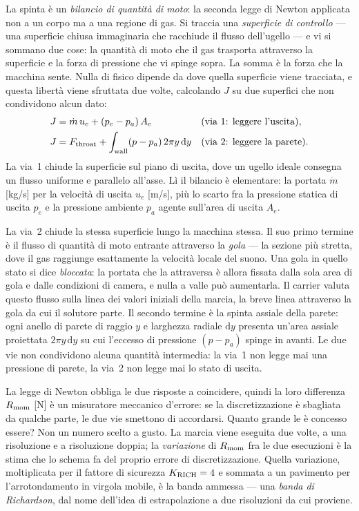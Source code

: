 La spinta è un \emph{bilancio di quantità di moto}: la seconda legge
di Newton applicata non a un corpo ma a una regione di gas. Si
traccia una \emph{superficie di controllo} --- una superficie chiusa
immaginaria che racchiude il flusso dell'ugello --- e vi si sommano
due cose: la quantità di moto che il gas trasporta attraverso la
superficie e la forza di pressione che vi spinge sopra. La somma è
la forza che la macchina sente. Nulla di fisico dipende da dove
quella superficie viene tracciata, e questa libertà viene sfruttata
due volte, calcolando $J$ su due superfici che non condividono alcun
dato:
\begin{align}
J &= \dot m\, u_e + (p_e - p_a)\, A_e
  &&\text{(via 1: leggere l'uscita),} \label{eq:route1}\\
J &= F_{\rm throat} + \int_{\rm wall} (p - p_a)\, 2\pi y \,\mathrm{d}y
  &&\text{(via 2: leggere la parete).} \label{eq:route2}
\end{align}
La via~1 chiude la superficie sul piano di uscita, dove un ugello
ideale consegna un flusso uniforme e parallelo all'asse. Lì il
bilancio è elementare: la portata $\dot m$ [kg/s] per la velocità di
uscita $u_e$ [m/s], più lo scarto fra la pressione statica di uscita
$p_e$ e la pressione ambiente $p_a$ agente sull'area di uscita
$A_e$.

La via~2 chiude la stessa superficie lungo la macchina stessa. Il
suo primo termine è il flusso di quantità di moto entrante
attraverso la \emph{gola} --- la sezione più stretta, dove il gas
raggiunge esattamente la velocità locale del suono. Una gola in
quello stato si dice \emph{bloccata}: la portata che la attraversa è
allora fissata dalla sola area di gola e dalle condizioni di camera,
e nulla a valle può aumentarla. Il carrier valuta questo flusso
sulla linea dei valori iniziali della marcia, la breve linea
attraverso la gola da cui il solutore parte. Il secondo termine è la
spinta assiale della parete: ogni anello di parete di raggio $y$ e
larghezza radiale $\mathrm{d}y$ presenta un'area assiale proiettata
$2\pi y\,\mathrm{d}y$ su cui l'eccesso di pressione $(p - p_a)$
spinge in avanti. Le due vie non condividono alcuna quantità
intermedia: la via~1 non legge mai una pressione di parete, la via~2
non legge mai lo stato di uscita.

La legge di Newton obbliga le due risposte a coincidere, quindi la
loro differenza $R_{\rm mom}$ [N] è un misuratore meccanico
d'errore: se la discretizzazione è sbagliata da qualche parte, le
due vie smettono di accordarsi. Quanto grande le è concesso essere?
Non un numero scelto a gusto. La marcia viene eseguita due volte, a
una risoluzione e a risoluzione doppia; la \emph{variazione} di
$R_{\rm mom}$ fra le due esecuzioni è la stima che lo schema fa del
proprio errore di discretizzazione. Quella variazione, moltiplicata
per il fattore di sicurezza $K_{\rm RICH} = 4$ e sommata a un
pavimento per l'arrotondamento in virgola mobile, è la banda
ammessa --- una \emph{banda di Richardson}, dal nome dell'idea di
estrapolazione a due risoluzioni da cui proviene.

